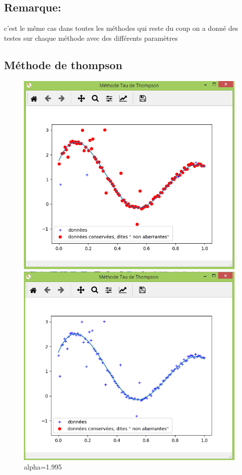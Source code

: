\documentclass[11pt]{report}
\begin{document}
 \subsection*{Remarque:}
 c'est le même cas dans toutes les méthodes qui reste du coup on a  donné des testes sur chaque méthode avec des différents paramètres 
 \subsection*{Méthode de thompson}
 



  \begin{figure}[!htb] %
\includegraphics[width=\linewidth]{thomn.PNG} %
\caption{alpha=1.995} %
\label{alpha1995} %
\endminipage
{}%
\includegraphics[width=\linewidth]{thomm.PNG}  

\end{figure}
\end{document}
